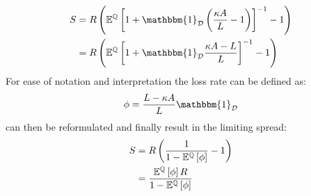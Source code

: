 \documentclass[../main.tex]{subfiles}
\begin{document}
            \begin{align}
                    S
                &=
                    \grossrfrate
                    \left(
                        \mathbb{E}^{\rnmeasure}\left[
                            1
                            +
                            \mathbbm{1}_{\mathcal{D}}
                            \left(
                                \frac{
                                    \kappa 
                                    A
                                }{
                                    L 
                                }
                                -
                                1
                            \right) 
                        \right]^{-1}
                        - 
                        1
                    \right)
                \nonumber \\
                &=
                    \grossrfrate
                    \left(
                        \mathbb{E}^{\rnmeasure}\left[
                            1
                            +
                            \mathbbm{1}_{\mathcal{D}}
                                \frac{
                                    \kappa 
                                    A
                                    -
                                    L
                                }{
                                    L 
                                }
                        \right]^{-1}
                        - 
                        1
                    \right)
                \label{eqn:limiting-credit-spread-step-1}
            \end{align}
        For ease of notation and interpretation the loss rate can be defined as:
            \begin{equation}
                \phi = \frac{
                        L - \kappa A
                    }{
                        L
                    } 
                \mathbbm{1}_{\mathcal{D}}
                \label{eqn:creditor-loss-rate}
            \end{equation}
         can then be reformulated and finally result in the limiting spread:
            \begin{align}
                    S
                &=
                    R
                    \left(
                        \frac{
                            1   
                        }{
                            1
                            -
                            \mathbb{E}^{\mathbb{Q}}\left[
                                \phi
                            \right]
                        }
                        - 
                        1
                    \right)
                \nonumber \\
                &=
                    \frac{
                        \mathbb{E}^{\mathbb{Q}}\left[\phi\right]
                        R
                    }{
                        1
                        -
                        \mathbb{E}^{\mathbb{Q}}\left[\phi\right]
                    }
                \label{eqn:limiting-spread}
            \end{align}
\end{document}
